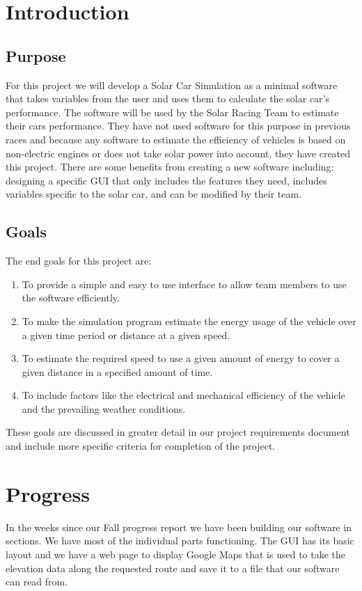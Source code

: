 \begin{singlespace}
\renewcommand{\familydefault}{\sfdefault}

\section{Introduction}

\subsection{Purpose}
For this project we will develop a Solar Car Simulation as a minimal software that takes variables from the user and uses them to calculate the solar car's performance.
The software will be used by the Solar Racing Team to estimate their cars performance. 
They have not used software for this purpose in previous races and because any software to estimate the efficiency of vehicles is based on non-electric engines or does not take solar power into account, they have created this project. 
There are some benefits from creating a new software including: designing a specific GUI that only includes the features they need, includes variables specific to the solar car, and can be modified by their team.

\subsection{Goals}
The end goals for this project are: 
    \begin{enumerate}
        \item To provide a simple and easy to use interface to allow team members to use the software efficiently. 
        \item To make the simulation program estimate the energy usage of the vehicle over a given time period or distance at a given speed.
        \item To estimate the required speed to use a given amount of energy to cover a given distance in a specified amount of time. 
        \item To include factors like the electrical and mechanical efficiency of the vehicle and the prevailing weather conditions. 
    \end{enumerate}
These goals are discussed in greater detail in our project requirements document and include more specific criteria for completion of the project.

\section{Progress}
In the weeks since our Fall progress report we have been building our software in sections.
We have most of the individual parts functioning.
The GUI has its basic layout and we have a web page to display Google Maps that is used to take the elevation data along the requested route and save it to a file that our software can read from. 


\end{singlespace}
